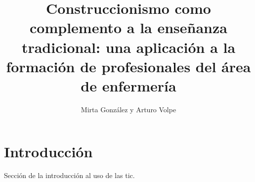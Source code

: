 \documentclass[final,fmstyle]{./util/ucathesis}
\title{Construccionismo como complemento a la enseñanza tradicional:  una
	aplicación a la formación de profesionales del área de enfermería}
\author{Mirta González y Arturo Volpe}
\begin{document}


\maketitle

\tableofcontents
\listoffigures
\listoftables
\listofalgorithms

\listoftodos[TODO]


\printglossary[type=\acronymtype,title=Lista de Siglas]



\mainmatter

\chapter{Introducción}

Sección de la introducción al uso de las \Gls{tic}.








\printbibliography
\end{document}
